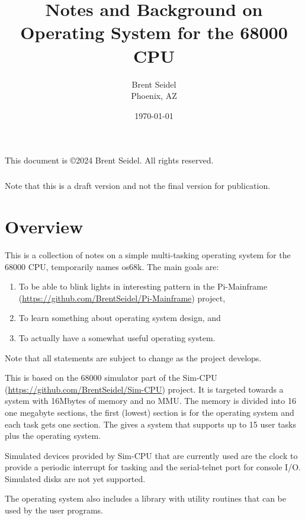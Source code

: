 \documentclass[10pt]{book}
\title{Notes and Background on Operating System for the 68000 CPU}
\author{Brent Seidel \\ Phoenix, AZ}
\date{ \today }
\begin{document}
\maketitle
\begin{center}
This document is \copyright 2024 Brent Seidel.  All rights reserved.

\paragraph{}Note that this is a draft version and not the final version for publication.
\end{center}
\tableofcontents

\chapter{Overview}

This is a collection of notes on a simple multi-tasking operating system for the 68000 CPU, temporarily names os68k.  The main goals are:
\begin{enumerate}
  \item To be able to blink lights in interesting pattern in the Pi-Mainframe (\url{https://github.com/BrentSeidel/Pi-Mainframe}) project,
  \item To learn something about operating system design, and
  \item To actually have a somewhat useful operating system.
\end{enumerate}

Note that all statements are subject to change as the project develops.

This is based on the 68000 simulator part of the Sim-CPU (\url{https://github.com/BrentSeidel/Sim-CPU}) project.  It is targeted towards a system with 16Mbytes of memory and no MMU.  The memory is divided into 16 one megabyte sections, the first (lowest) section is for the operating system and each task gets one section.  The gives a system that supports up to 15 user tasks plus the operating system.

Simulated devices provided by Sim-CPU that are currently used are the clock to provide a periodic interrupt for tasking and the serial-telnet port for console I/O.  Simulated disks are not yet supported.

The operating system also includes a library with utility routines that can be used by the user programs.

\end{document}
